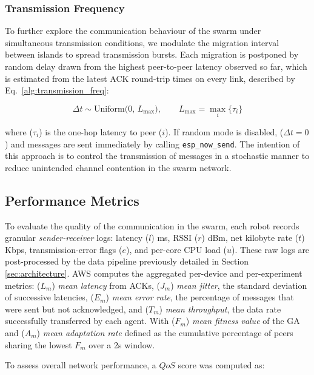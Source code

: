\documentclass[conference]{IEEEtran}
\begin{document}
\subsubsection{Transmission Frequency}\label{sec:transmission-frequency}

To further explore the communication behaviour of the swarm under simultaneous transmission conditions, we modulate the migration interval between islands to spread transmission bursts. Each migration is postponed by random delay drawn from the highest peer-to-peer latency observed so far, which is estimated from the latest ACK round-trip times on every link, described by Eq.~\ref{alg:transmission_freq}:

\begin{equation}\label{alg:transmission_freq}
\Delta t \sim \mathrm{Uniform}\bigl(0,\,L_{\max}\bigr), 
\qquad
L_{\max} = \max_{i}\{\tau_{i}\}
\end{equation}

where ($\tau_{i}$) is the one-hop latency to peer ($i$). If random mode is disabled, ($\Delta t = 0$) and messages are sent immediately by calling \texttt{esp\_now\_send}. The intention of this approach is to control the transmission of messages in a stochastic manner to reduce unintended channel contention in the swarm network.

\subsection{Performance Metrics}\label{sec:evaluation-metrics}

To evaluate the quality of the communication in the swarm, each robot records granular \emph{sender-receiver} logs: latency ($l$) ms, RSSI ($r$) dBm, net kilobyte rate ($t$) Kbps, transmission-error flags ($e$), and per-core CPU load ($u$). These raw logs are post-processed by the data pipeline previously detailed in Section \ref{sec:architecture}. AWS computes the aggregated per-device and per-experiment metrics: ($L_m$) \emph{mean latency} from ACKs, ($J_m$) \emph{mean jitter}, the standard deviation of successive latencies, ($E_m$) \emph{mean error rate}, the percentage of messages that were sent but not acknowledged, and ($T_m$) \emph{mean throughput}, the data rate successfully transferred by each agent. With ($F_m$) \emph{mean fitness value} of the GA and ($A_m$) \emph{mean adaptation rate} defined as the cumulative percentage of peers sharing the lowest $F_m$ over a 2s window.

To assess overall network performance, a $QoS$ score was computed as:
\end{document}
